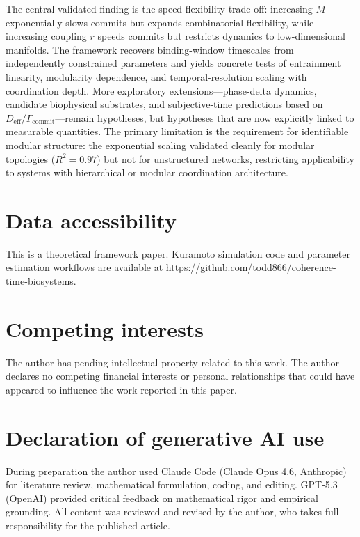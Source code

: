 \documentclass[12pt]{article}
\newcommand{\Deff}{D_{\mathrm{eff}}}
\begin{document}
The central validated finding is the speed-flexibility trade-off: increasing $M$ exponentially slows commits but expands combinatorial flexibility, while increasing coupling $r$ speeds commits but restricts dynamics to low-dimensional manifolds. The framework recovers binding-window timescales from independently constrained parameters and yields concrete tests of entrainment linearity, modularity dependence, and temporal-resolution scaling with coordination depth. More exploratory extensions---phase-delta dynamics, candidate biophysical substrates, and subjective-time predictions based on $\Deff / \Gamma_{\mathrm{commit}}$---remain hypotheses, but hypotheses that are now explicitly linked to measurable quantities. The primary limitation is the requirement for identifiable modular structure: the exponential scaling validated cleanly for modular topologies ($R^2 = 0.97$) but not for unstructured networks, restricting applicability to systems with hierarchical or modular coordination architecture.

\section*{Data accessibility}

This is a theoretical framework paper. Kuramoto simulation code and parameter estimation workflows are available at \url{https://github.com/todd866/coherence-time-biosystems}.

\section*{Competing interests}

The author has pending intellectual property related to this work. The author declares no competing financial interests or personal relationships that could have appeared to influence the work reported in this paper.

\section*{Declaration of generative AI use}

During preparation the author used Claude Code (Claude Opus 4.6, Anthropic) for literature review, mathematical formulation, coding, and editing. GPT-5.3 (OpenAI) provided critical feedback on mathematical rigor and empirical grounding. All content was reviewed and revised by the author, who takes full responsibility for the published article.
\end{document}
